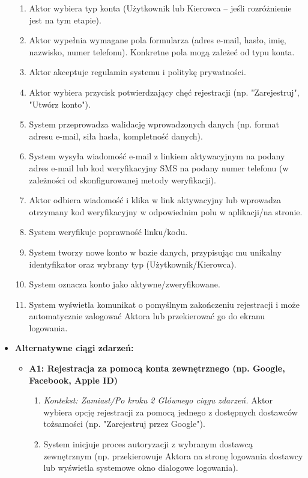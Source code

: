 \documentclass[a4paper,12pt]{article}
\begin{document}
\begin{itemize}
\begin{enumerate}
            \item Aktor wybiera typ konta (Użytkownik lub Kierowca – jeśli rozróżnienie jest na tym etapie).
            \item Aktor wypełnia wymagane pola formularza (adres e-mail, hasło, imię, nazwisko, numer telefonu). Konkretne pola mogą zależeć od typu konta.
            \item Aktor akceptuje regulamin systemu i politykę prywatności.
            \item Aktor wybiera przycisk potwierdzający chęć rejestracji (np. "Zarejestruj", "Utwórz konto").
            \item System przeprowadza walidację wprowadzonych danych (np. format adresu e-mail, siła hasła, kompletność danych).
            \item System wysyła wiadomość e-mail z linkiem aktywacyjnym na podany adres e-mail lub kod weryfikacyjny SMS na podany numer telefonu (w zależności od skonfigurowanej metody weryfikacji).
            \item Aktor odbiera wiadomość i klika w link aktywacyjny lub wprowadza otrzymany kod weryfikacyjny w odpowiednim polu w aplikacji/na stronie.
            \item System weryfikuje poprawność linku/kodu.
            \item System tworzy nowe konto w bazie danych, przypisując mu unikalny identyfikator oraz wybrany typ (Użytkownik/Kierowca).
            \item System oznacza konto jako aktywne/zweryfikowane.
            \item System wyświetla komunikat o pomyślnym zakończeniu rejestracji i może automatycznie zalogować Aktora lub przekierować go do ekranu logowania.
        \end{enumerate}
    \item \textbf{Alternatywne ciągi zdarzeń:}
        \begin{itemize}
            \item \textbf{A1: Rejestracja za pomocą konta zewnętrznego (np. Google, Facebook, Apple ID)}
                \begin{enumerate}
                    \item \textit{Kontekst: Zamiast/Po kroku 2 Głównego ciągu zdarzeń.} Aktor wybiera opcję rejestracji za pomocą jednego z dostępnych dostawców tożsamości (np. "Zarejestruj przez Google").
                    \item System inicjuje proces autoryzacji z wybranym dostawcą zewnętrznym (np. przekierowuje Aktora na stronę logowania dostawcy lub wyświetla systemowe okno dialogowe logowania).

\end{enumerate}
\end{itemize}
\end{itemize}
\end{document}
